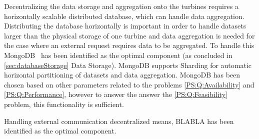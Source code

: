 Decentralizing the data storage and aggregation onto the turbines requires a horizontally scalable distributed database, which can handle data aggregation. Distributing the database horizontally is important in order to handle datasets larger than the physical storage of one turbine and data aggregation is needed for the case where an external request requires data to be aggregated. To handle this MongoDB~\cite{mongodb} has been identified as the optimal component (as concluded in \cref{sec:databaseStorage} Data Storage). MongoDB supports Sharding for automatic horizontal partitioning of datasets and data aggregation. MongoDB has been chosen based on other parameters related to the problems \ref{PS:Q:Availability} and \cref{PS:Q:Performance}, however to answer the answer the \ref{PS:Q:Feasibility} problem, this functionality is sufficient. 

Handling external communication decentralized means, BLABLA  has been identified as the optimal component.

\clearpage